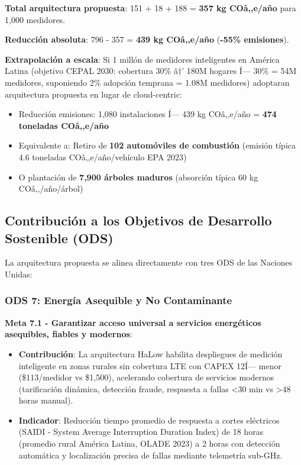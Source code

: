 \textbf{Total arquitectura propuesta}: 151 + 18 + 188 = \textbf{357 kg COâ‚‚e/año} para 1,000 medidores.

\textbf{Reducción absoluta}: 796 - 357 = \textbf{439 kg COâ‚‚e/año} (\textbf{-55\% emisiones}).

\textbf{Extrapolación a escala}: Si 1 millón de medidores inteligentes en América Latina (objetivo CEPAL 2030: cobertura 30\% â†’ 180M hogares Í— 30\% = 54M medidores, suponiendo 2\% adopción temprana = 1.08M medidores) adoptaran arquitectura propuesta en lugar de cloud-centric:
\begin{itemize}
    \item Reducción emisiones: 1,080 instalaciones Í— 439 kg COâ‚‚e/año = \textbf{474 toneladas COâ‚‚e/año}
    \item Equivalente a: Retiro de \textbf{102 automóviles de combustión} (emisión típica 4.6 toneladas COâ‚‚e/año/vehículo EPA 2023)
    \item O plantación de \textbf{7,900 árboles maduros} (absorción típica 60 kg COâ‚‚/año/árbol)
\end{itemize}

\subsection{Contribución a los Objetivos de Desarrollo Sostenible (ODS)}

La arquitectura propuesta se alinea directamente con tres ODS de las Naciones Unidas:

\subsubsection{ODS 7: Energía Asequible y No Contaminante}

\textbf{Meta 7.1 - Garantizar acceso universal a servicios energéticos asequibles, fiables y modernos}:
\begin{itemize}
    \item \textbf{Contribución}: La arquitectura HaLow habilita despliegues de medición inteligente en zonas rurales sin cobertura LTE con CAPEX 12Í— menor (\$113/medidor vs \$1,500), acelerando cobertura de servicios modernos (tarificación dinámica, detección fraude, respuesta a fallas <30 min vs >48 horas manual).
    \item \textbf{Indicador}: Reducción tiempo promedio de respuesta a cortes eléctricos (SAIDI - System Average Interruption Duration Index) de 18 horas (promedio rural América Latina, OLADE 2023) a 2 horas con detección automática y localización precisa de fallas mediante telemetría sub-GHz.
\end{itemize}

